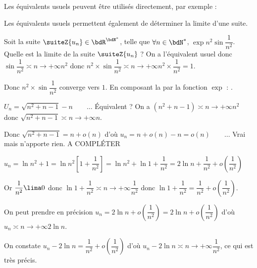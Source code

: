 \documentclass[a4paper,french,bookmarks]{article}
\begin{document}
Les équivalents usuels peuvent être utilisés directement, par exemple :
\begin{example}{}{}
    \begin{enumerate}
    \begin{multicols}{2}
        \itarr {}
        \itarr {}
    \end{multicols}
    \end{enumerate}
\end{example}
Les équivalents usuels permettent également de déterminer la limite d'une suite.
\begin{example}{}{}
        Soit la suite $\suiteZ{u_n} \in \bdR^{\bdN^*}$, telle que $\forall n \in \bdN^*$, $\exp{n^2\sin{\dfrac{1}{n^2}}}$.
        Quelle est la limite de la suite $\suiteZ{u_n}$ ?
        \tcblower 
        On a l'équivalent usuel donc $\sin{\dfrac{1}{n^2}} \asymp{n \to +\infty} n^2$ donc $n^2 \times \sin{\dfrac{1}{n^2}} \asymp{n \to +\infty} n^2 \times \dfrac{1}{n^2} = 1$.
        
        Donc $n^2 \times \sin{\dfrac{1}{n^2}}$ converge vers $1$. En composant la par la fonction $\exp$ : .
        
\end{example}
\begin{example}{}{}
        $U_n = \sqrt{n^2 + n - 1} - n \qquad \dots$ Équivalent ? On a $(n^2 + n - 1)  \asymp{n \to +\infty} n^2$ donc $\sqrt{n^2 + n - 1}  \asymp{n \to +\infty} n$. 
        
        Donc $\sqrt{n^2 + n - 1} = n + o(n)$ d'où $u_n = n + o(n) - n = o(n) \qquad \dots$ Vrai mais n'apporte rien.
        A COMPLÉTER
        
\end{example}
\begin{example}{}{}
        $u_n = \ln{n^2 + 1} = \ln{n^2\left[1+\dfrac{1}{n^2}\right]} = \ln{n^2} + \ln{1+\dfrac{1}{n^2}} = 2\ln{n} + \dfrac{1}{n^2} + o\left(\dfrac{1}{n^2}\right)$
        
        Or $\dfrac{1}{n^2} \lima 0$ donc $\ln{1+\dfrac{1}{n^2}} \asymp{n \to +\infty} \dfrac{1}{n^2}$ donc $\ln{1+\dfrac{1}{n^2}} = \dfrac{1}{n^2} + o\left(\dfrac{1}{n^2}\right)$.
        
        On peut prendre en précision $u_n = 2\ln n + o\left(\dfrac{1}{n^2}\right) = 2\ln n + o\left(\dfrac{1}{n^2}\right)$ d'où $u_n \asymp{n \to +\infty} 2\ln n$.
        
        On constate $u_n - 2\ln n = \dfrac{1}{n^2} + o\left(\dfrac{1}{n^2}\right)$ d'où $u_n - 2\ln n \asymp{n \to +\infty} \dfrac{1}{n^2}$, ce qui est très précis.
\end{example}
\end{document}
